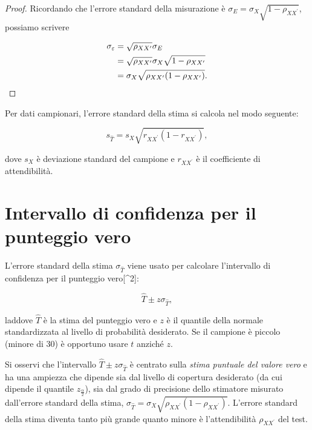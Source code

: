 \documentclass[
  11pt,
]{krantz}
\theoremstyle{definition}
\theoremstyle{definition}
\theoremstyle{definition}
\theoremstyle{definition}
\theoremstyle{remark}
\begin{document}
\begin{proof}
Ricordando che l'errore standard della misurazione è \(\sigma_E = \sigma_X \sqrt{1 - \rho_{XX^\prime}}\), possiamo scrivere

\begin{equation}
\begin{aligned}
\sigma_{\varepsilon}  &= \sqrt{\rho_{XX^\prime}} \sigma_E \notag\\
&= \sqrt{\rho_{XX^\prime}} \sigma_X
\sqrt{1-\rho_{XX^\prime}} \notag\\
&= \sigma_X \sqrt{\rho_{XX^\prime} (1 - \rho_{XX^\prime})}.\notag
\end{aligned}
\end{equation}
\end{proof}

Per dati campionari, l'errore standard della stima si calcola nel modo seguente:

\[
s_{\hat{T}} = s_X \sqrt{r_{XX^\prime} (1-r_{XX^\prime})},
\]

dove \(s_X\) è deviazione standard del campione e \(r_{XX^\prime}\) è il coefficiente di attendibilità.

\hypertarget{intervallo-di-confidenza-per-il-punteggio-vero}{%
\section{Intervallo di confidenza per il punteggio vero}\label{intervallo-di-confidenza-per-il-punteggio-vero}}

L'errore standard della stima \(\sigma_{\hat{T}}\) viene usato per calcolare l'intervallo di confidenza per il punteggio vero{[}\^{}2{]}:

\[
\hat{T} \pm z  \sigma_{\hat{T}},
\]

laddove \(\hat{T}\) è la stima del punteggio vero e \(z\) è il quantile della normale standardizzata al livello di probabilità desiderato. Se il campione è piccolo (minore di 30) è opportuno usare \(t\) anziché \(z\).

Si osservi che l'intervallo \(\hat{T} \pm z \sigma_{\hat{T}}\) è centrato sulla \emph{stima puntuale del valore vero} e ha una ampiezza che dipende sia dal livello di copertura desiderato (da cui dipende il quantile \(z_{\frac{\alpha}{2}}\)), sia dal grado di precisione dello stimatore misurato dall'errore standard della stima, \(\sigma_{\hat{T}} = \sigma_X \sqrt{\rho_{XX^\prime} (1 -\rho_{XX^\prime})}\). L'errore standard della stima diventa tanto più grande quanto minore è l'attendibilità \(\rho_{XX^\prime}\) del test.
\end{document}
